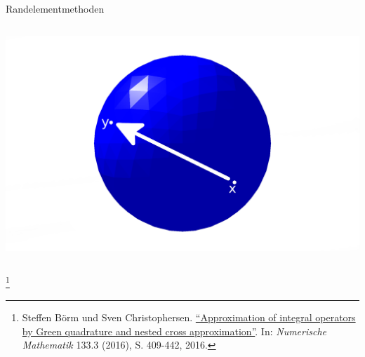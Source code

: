 \documentclass[10pt]{beamer}
\let\svthefootnote\thefootnote
\begin{document}
\begin{frame}{Randelementmethoden}
\begin{columns}
\begin{overprint}
        \includegraphics[width=1.5\linewidth]{figures/fg-sphere-full-inf.pdf}
      \end{overprint}

  \end{columns}
  \footnotesize
  \let\thefootnote\relax\footnote{Steffen Börm und Sven Christophersen.
  \href{https://link.springer.com/article/10.1007\%2Fs00211-015-0757-y}{
  ``Approximation of integral operators by Green quadrature and nested cross 
  approximation''}. In: \textit{Numerische Mathematik} 133.3 (2016), S. 
  409-442, 2016.}
  \addtocounter{footnote}{-1}\let\thefootnote\svthefootnote\relax
  \normalsize
\end{frame}
\end{document}
